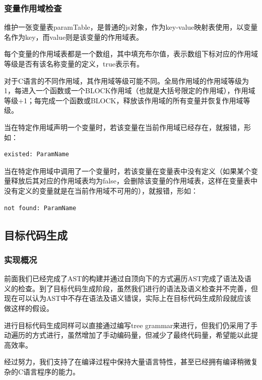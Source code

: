 \documentclass[a4paper]{article}
\begin{document}
\begin{CJK*}{UTF8}{gbsn}
    \subsubsection{变量作用域检查}
    维护一张变量表paramTable，是普通的js对象，作为key-value映射表使用，以变量名作为key，而value则是该变量的作用域表。
    \par 每个变量的作用域表都是一个数组，其中填充布尔值，表示数组下标对应的作用域等级是否有该名称变量的定义，true表示有。
    \par 对于C语言的不同作用域，其作用域等级可能不同。全局作用域的作用域等级为1，每进入一个函数或一个BLOCK作用域（也就是大括号限定的作用域），作用域等级+1；每完成一个函数或BLOCK，释放该作用域的所有变量并恢复作用域等级。
    \par 当在特定作用域声明一个变量时，若该变量在当前作用域已经存在，就报错，形如：
    \begin{verbatim}
existed: ParamName
    \end{verbatim}
    \par 当在特定作用域中调用了一个变量时，若该变量在变量表中没有定义（如果某个变量释放后其对应的作用域表均为false，会删除该变量的作用域表，这样在变量表中没有定义的变量就是在当前作用域不可用的），就报错，形如：
    \begin{verbatim}
not found: ParamName
    \end{verbatim}

    \subsection{目标代码生成}
    \subsubsection{实现概况}
    前面我们已经完成了AST的构建并通过自顶向下的方式遍历AST完成了语法及语义的检查。到了目标代码生成阶段，虽然我们进行的语法及语义检查并不完善，但现在可以认为AST中不存在语法及语义错误，实际上在目标代码生成阶段就应该做这样的假设。
    \par 进行目标代码生成同样可以直接通过编写tree grammar来进行，但我们仍采用了手动遍历的方式进行，虽然增加了手动编码量，但减少了最终代码量，希望能以此提高效率。
    \par 经过努力，我们支持了在编译过程中保持大量语言特性，甚至已经拥有编译稍微复杂的C语言程序的能力。


\end{CJK*}
\end{document}
